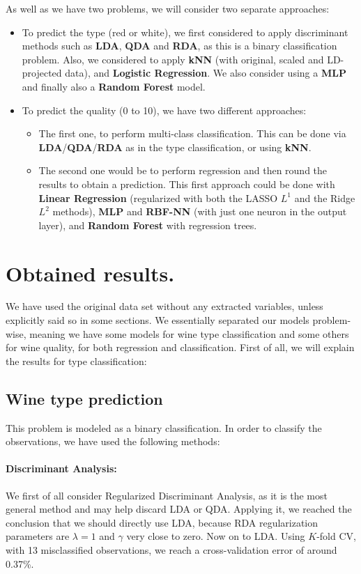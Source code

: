 \documentclass[10pt]{article}
\begin{document}
As well as we have two problems, we will consider two separate approaches:
\begin{itemize}
	\item To predict the type (red or white), we first considered to apply discriminant methods such as \textbf{LDA}, \textbf{QDA} and \textbf{RDA}, as this is a binary classification problem. Also, we considered to apply \textbf{kNN} (with original, scaled and LD-projected data), and \textbf{Logistic Regression}. We also consider using a \textbf{MLP} and finally also a \textbf{Random Forest} model.
	\item To predict the quality (0 to 10), we have two different approaches:
	\begin{itemize}
		\item The first one, to perform multi-class classification. This can be done via \textbf{LDA}/\textbf{QDA}/\textbf{RDA} as in the type classification, or using \textbf{kNN}.
		\item The second one would be to perform regression and then round the results to obtain a prediction. This first approach could be done with \textbf{Linear Regression} (regularized with both the LASSO $L^1$ and the Ridge $L^2$ methods), \textbf{MLP} and \textbf{RBF-NN} (with just one neuron in the output layer), and \textbf{Random Forest} with regression trees.
	\end{itemize}		
\end{itemize}

\section{Obtained results.}

We have used the original data set without any extracted variables, unless explicitly said so in some sections. We essentially separated our models problem-wise, meaning we have some models for wine type classification and some others for wine quality, for both regression and classification. First of all, we will explain the results for type classification:
\subsection{Wine type prediction}

This problem is modeled as a binary classification. In order to classify the observations, we have used the following methods:
\paragraph{Discriminant Analysis:}
We first of all consider Regularized Discriminant Analysis, as it is the most general method and may help discard LDA or QDA. Applying it, we reached the conclusion that we should directly use LDA, because RDA regularization parameters are $\lambda=1$ and $\gamma$ very close to zero. Now on to LDA. Using $K$-fold CV, with 13 misclassified observations, we reach a cross-validation error of around 0.37\%.
\end{document}
